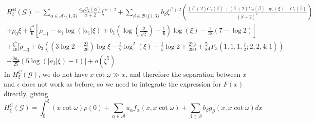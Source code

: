 \documentclass{article}
\newcommand{\graph}{\mathcal{G}}
\begin{document}
\begin{align}
    H_{\xi}^B(\graph) = \sum_{\alpha\in \mathcal{A}\setminus\{1,3\}} \frac{a_{\alpha}C_2(\alpha)}{\alpha+2}{\xi}^{\alpha+2} + \sum_{\beta \in \mathcal{B}\setminus\{1,3\}} b_{\beta}\xi^{\beta+2}\left(\frac{(\beta+2)C_1(\beta)+(\beta+2)C_2(\beta)\log(\xi) - C_2(\beta)}{(\beta+2)^2}\right)  \nonumber \\
    + \rho_0\xi + \frac{\xi^3}{6}\left[\tilde{\rho}_{-1} -a_1\log(|a_1|\xi)  + b_1\left(\log\left(\frac{2}{\sqrt{\xi}}\right) + \frac{1}{6}\right)\log(\xi) - \frac{1}{18}\left(7-\log 2\right) \right] \nonumber \\
      + \frac{\xi^5}{40}\Big[\tilde{\rho}_{-3}+b_3\left(\left(3\log 2 - \frac{23}{20}\right)\log \xi - \frac{3}{2}\log^2(\xi) - \frac{3}{5}\log 2 + \frac{273}{200} + \frac{5}{8}{_4}F_3\left(1,1,1,\frac{7}{2};2,2,4;1\right)\right) \nonumber \\ - \frac{3a_3}{25} (5\log(|a_3|\xi)-1)\Big] + o(\xi^5)
\end{align}
In $H_{\xi}^C(\graph)$, we do not have $x\cot \omega \gg x$, and therefore the separation between $x$ and $\epsilon$ does not work as before, so we need to integrate the expression for $F(x)$ directly, giving
\begin{equation}
    H_{\xi}^C(\graph) = \int_0^{\xi} (x\cot \omega)\rho(0) + \sum_{\alpha \in \mathcal{A}} a_{\alpha}f_{\alpha}(x,x\cot \omega) + \sum_{\beta \in \mathcal{B}}b_{\beta}g_{\beta}(x,x\cot \omega) dx
\end{equation}
\end{document}

